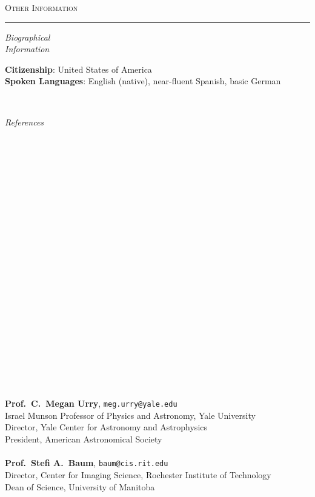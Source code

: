 \documentclass[11pt]{article}
\makeatletter
\def\vhrulefill#1{\leavevmode\leaders\hrule\@height#1\hfill \kern\z@}
\makeatother
\begin{document}
\clearpage
\textsc{Other Information} \vhrulefill{0.4pt}

\vspace{4mm}


\hspace{2.5mm} \parbox{1.5in}{\textit{Biographical \\ Information  }} \parbox{5.15in}{
\textbf{Citizenship}: United States of America\\
\textbf{Spoken Languages}: English (native), near-fluent Spanish, basic German}\\

\vspace{4mm}



\hspace{2.5mm} \parbox{1.5in}{\textit{References \\\\\\\\\\\\\\\\\\\\\\\\\\\\\\\\\\\\\\\\\\\\\\}} \parbox{5.15in}{
\textbf{Prof.~C.~Megan Urry}, \texttt{meg.urry@yale.edu}\\
Israel Munson Professor of Physics and Astronomy, Yale University\\
Director, Yale Center for Astronomy and Astrophysics\\
President, American Astronomical Society\\ \\
\textbf{Prof.~Stefi A.~Baum}, \texttt{baum@cis.rit.edu}\\
Director, Center for Imaging Science, Rochester Institute of Technology\\
Dean of Science, University of Manitoba\\ \\
}
\end{document}

